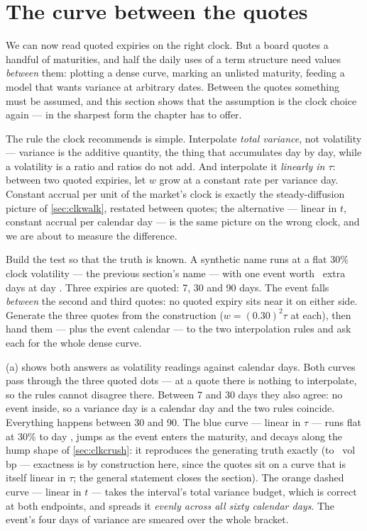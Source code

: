 \section{The curve between the quotes}
\label{sec:clkinterp}

We can now read quoted expiries on the right clock.  But a board
quotes a handful of maturities, and half the daily uses of a term
structure need values \emph{between} them: plotting a dense curve,
marking an unlisted maturity, feeding a model that wants variance at
arbitrary dates.  Between the quotes something must be assumed, and
this section shows that the assumption is the clock choice again ---
in the sharpest form the chapter has to offer.

The rule the clock recommends is simple.  Interpolate \emph{total
variance}, not volatility --- variance is the additive quantity, the
thing that accumulates day by day, while a volatility is a ratio and
ratios do not add.  And interpolate it \emph{linearly in $\tau$}:
between two quoted expiries, let $w$ grow at a constant rate per
variance day.  Constant accrual per unit of the market's clock is
exactly the steady-diffusion picture of \cref{sec:clkwalk}, restated
between quotes; the alternative --- linear in $t$, constant accrual
per calendar day --- is the same picture on the wrong clock, and we
are about to measure the difference.

Build the test so that the truth is known.  A synthetic name runs at
a flat $30\%$ clock volatility --- the previous section's name ---
with one event worth \MacClkClockExtraDays\ extra days at day
\MacClkInterpEventDay.  Three expiries are quoted: 7, 30 and 90 days.
The event falls \emph{between} the second and third quotes: no quoted
expiry sits near it on either side.  Generate the three quotes from
the construction ($w=(0.30)^2\tau$ at each), then hand them --- plus
the event calendar --- to the two interpolation rules and ask each
for the whole dense curve.

(a) shows both answers as volatility readings
against calendar days.  Both curves pass through the three quoted
dots --- at a quote there is nothing to interpolate, so the rules
cannot disagree there.  Between 7 and 30 days they also agree: no
event inside, so a variance day is a calendar day and the two rules
coincide.  Everything happens between 30 and 90.  The blue curve ---
linear in $\tau$ --- runs flat at $30\%$ to day \MacClkInterpEventDay,
jumps as the event enters the maturity, and decays along the hump
shape of \cref{sec:clkcrush}: it reproduces the generating truth
exactly (to \MacClkInterpExactBp\ vol bp --- exactness is by
construction here, since the quotes sit on a curve that is itself
linear in $\tau$; the general statement closes the section).
The orange dashed curve --- linear in $t$ --- takes the interval's
total variance budget, which is correct at both endpoints, and
spreads it \emph{evenly across all sixty calendar days}.  The event's
four days of variance are smeared over the whole bracket.

